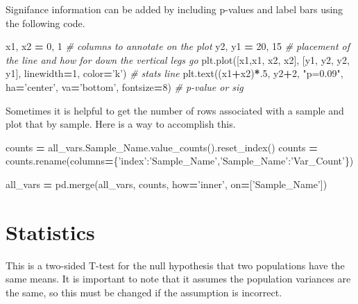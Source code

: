 \documentclass[]{book}
\newenvironment{Shaded}{\begin{snugshade}}{\end{snugshade}}
\newcommand{\CommentTok}[1]{\textcolor[rgb]{0.56,0.35,0.01}{\textit{#1}}}
\newcommand{\DecValTok}[1]{\textcolor[rgb]{0.00,0.00,0.81}{#1}}
\newcommand{\NormalTok}[1]{#1}
\newcommand{\OperatorTok}[1]{\textcolor[rgb]{0.81,0.36,0.00}{\textbf{#1}}}
\newcommand{\StringTok}[1]{\textcolor[rgb]{0.31,0.60,0.02}{#1}}
\begin{document}
Signifance information can be added by including p-values and label bars using the following code.

\begin{Shaded}
\begin{Highlighting}[]
\NormalTok{x1, x2 }\OperatorTok{=} \DecValTok{0}\NormalTok{, }\DecValTok{1} \CommentTok{# columns to annotate on the plot}
\NormalTok{y2, y1 }\OperatorTok{=} \DecValTok{20}\NormalTok{, }\DecValTok{15} \CommentTok{# placement of the line and how for down the vertical legs go}
\NormalTok{plt.plot([x1,x1, x2, x2], [y1, y2, y2, y1], linewidth}\OperatorTok{=}\DecValTok{1}\NormalTok{, color}\OperatorTok{=}\StringTok{'k'}\NormalTok{) }\CommentTok{# stats line}
\NormalTok{plt.text((x1}\OperatorTok{+}\NormalTok{x2)}\OperatorTok{*}\NormalTok{.}\DecValTok{5}\NormalTok{, y2}\OperatorTok{+}\DecValTok{2}\NormalTok{, }\StringTok{"p=0.09"}\NormalTok{, ha}\OperatorTok{=}\StringTok{'center'}\NormalTok{, va}\OperatorTok{=}\StringTok{'bottom'}\NormalTok{, fontsize}\OperatorTok{=}\DecValTok{8}\NormalTok{) }\CommentTok{# p-value or sig}
\end{Highlighting}
\end{Shaded}

Sometimes it is helpful to get the number of rows associated with a sample and plot that by sample. Here is a way to accomplish this.

\begin{Shaded}
\begin{Highlighting}[]
\NormalTok{counts }\OperatorTok{=}\NormalTok{ all_vars.Sample_Name.value_counts().reset_index()}
\NormalTok{counts }\OperatorTok{=}\NormalTok{ counts.rename(columns}\OperatorTok{=}\NormalTok{\{}\StringTok{'index'}\NormalTok{:}\StringTok{'Sample_Name'}\NormalTok{,}\StringTok{'Sample_Name'}\NormalTok{:}\StringTok{'Var_Count'}\NormalTok{\})}

\NormalTok{all_vars }\OperatorTok{=}\NormalTok{ pd.merge(all_vars, counts, how}\OperatorTok{=}\StringTok{'inner'}\NormalTok{, on}\OperatorTok{=}\NormalTok{[}\StringTok{'Sample_Name'}\NormalTok{])}
\end{Highlighting}
\end{Shaded}

\hypertarget{statistics}{%
\section{Statistics}\label{statistics}}

This is a two-sided T-test for the null hypothesis that two populations have the same means. It is important to note that it assumes the population variances are the same, so this must be changed if the assumption is incorrect.
\end{document}
